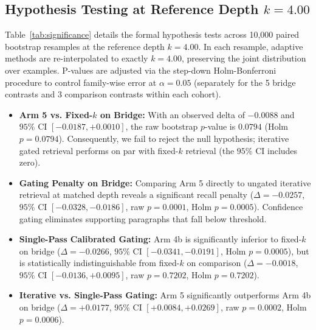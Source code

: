 \documentclass[conference]{IEEEtran}
\begin{document}
\subsection{Hypothesis Testing at Reference Depth $k=4.00$}
Table~\ref{tab:significance} details the formal hypothesis tests across 10,000 paired bootstrap resamples at the reference depth $k=4.00$. In each resample, adaptive methods are re-interpolated to exactly $k=4.00$, preserving the joint distribution over examples. P-values are adjusted via the step-down Holm-Bonferroni procedure to control family-wise error at $\alpha = 0.05$ (separately for the 5 bridge contrasts and 3 comparison contrasts within each cohort).
\begin{itemize}
    \item \textbf{Arm 5 vs. Fixed-$k$ on Bridge:} With an observed delta of $-0.0088$ and $95\%$ CI $[-0.0187, +0.0010]$, the raw bootstrap $p$-value is $0.0794$ (Holm $p = 0.0794$). Consequently, we fail to reject the null hypothesis; iterative gated retrieval performs on par with fixed-$k$ retrieval (the $95\%$ CI includes zero).
    \item \textbf{Gating Penalty on Bridge:} Comparing Arm 5 directly to ungated iterative retrieval at matched depth reveals a significant recall penalty ($\Delta = -0.0257$, $95\%$ CI $[-0.0328, -0.0186]$, raw $p = 0.0001$, Holm $p = 0.0005$). Confidence gating eliminates supporting paragraphs that fall below threshold.
    \item \textbf{Single-Pass Calibrated Gating:} Arm 4b is significantly inferior to fixed-$k$ on bridge ($\Delta = -0.0266$, $95\%$ CI $[-0.0341, -0.0191]$, Holm $p = 0.0005$), but is statistically indistinguishable from fixed-$k$ on comparison ($\Delta = -0.0018$, $95\%$ CI $[-0.0136, +0.0095]$, raw $p = 0.7202$, Holm $p = 0.7202$).
    \item \textbf{Iterative vs. Single-Pass Gating:} Arm 5 significantly outperforms Arm 4b on bridge ($\Delta = +0.0177$, $95\%$ CI $[+0.0084, +0.0269]$, raw $p = 0.0002$, Holm $p = 0.0006$).
\end{itemize}
\end{document}
